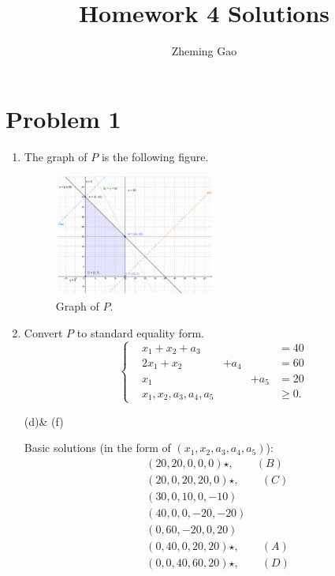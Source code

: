 \documentclass[12pt]{article}
\begin{document}
 
 
\title{Homework 4 Solutions}
\author{Zheming Gao}
\maketitle

\section*{Problem 1}
\begin{enumerate}[label = (\alph*)]
\item

The graph of $P$ is the following figure.

\begin{figure}[htbp]
  \caption{Graph of $P$.}
  \centering
    \includegraphics[width=0.5\textwidth]{2_7f.pdf}
\end{figure}

\FloatBarrier

\item

Convert $P$ to standard equality form.
$$
\left\{
\begin{aligned}
& x_1 + x_2 + a_3 & & & = 40 \\
& 2x_1 + x_2 & + a_4 & &  = 60  \\
& x_1 & & + a_5 & = 20  \\
& x_1, x_2, a_3, a_4, a_5 & & & \geqslant 0.
\end{aligned}
\right.
$$

\item [(d)\& (f)]

Basic solutions (in the form of $(x_1, x_2, a_3, a_4, a_5)$): 
$$
\begin{aligned}
&(20, 20, 0, 0, 0)  \star, \qquad (B)\\ 
&(20, 0, 20, 20, 0) \star, \qquad (C)\\ 
&(30, 0, 10, 0, -10) \\
& (40, 0, 0, -20, -20) \\ 
 & (0, 60, -20, 0, 20) \\
 & (0, 40, 0, 20, 20) \star, \qquad (A)  \\
 & (0, 0, 40, 60, 20) \star , \qquad (D)
\end{aligned}
$$




\end{enumerate}
\end{document}
